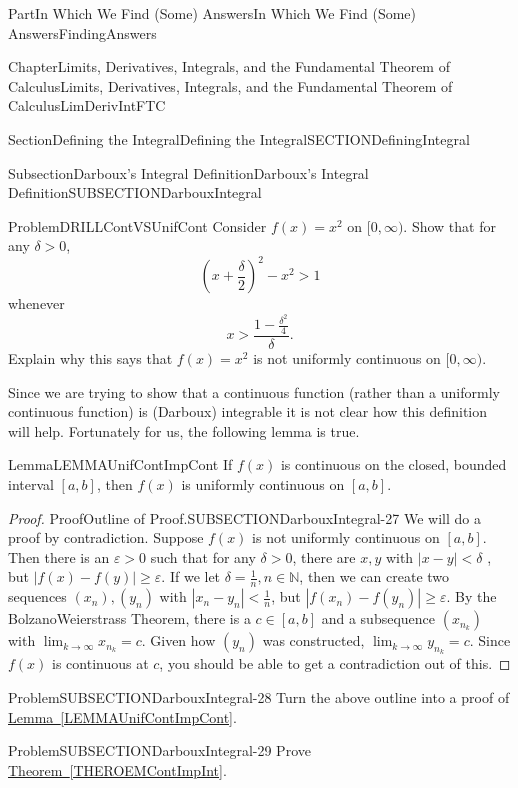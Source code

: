 \documentclass[oneside,10pt,]{book}
\newcommand{\xreffont}{\relax}
\numberwithin{equation}{part}
\def\limit#1#2#3{{\displaystyle\lim_{#1\rightarrow #2}#3}}
\newcommand{\eps}{\varepsilon}
\newcommand{\lt}{<}
\begin{document}
\begin{partptx}{Part}{In Which We Find (Some) Answers}{}{In Which We Find (Some) Answers}{}{}{FindingAnswers}
\begin{chapterptx}{Chapter}{Limits, Derivatives, Integrals, and the Fundamental Theorem of Calculus}{}{Limits, Derivatives, Integrals, and the Fundamental Theorem of Calculus}{}{}{LimDerivIntFTC}
\begin{sectionptx}{Section}{Defining the Integral}{}{Defining the Integral}{}{}{SECTIONDefiningIntegral}
\begin{subsectionptx}{Subsection}{Darboux's Integral Definition}{}{Darboux's Integral Definition}{}{}{SUBSECTIONDarbouxIntegral}
\begin{problem}{Problem}{}{DRILLContVSUnifCont}
Consider \(f(x)=x^2\) on \([0,\infty )\).  Show that for any \(\delta >0\),%
\begin{equation*}
\left(x+\frac{\delta }{2}\right)^2-x^2>1
\end{equation*}
whenever%
\begin{equation*}
x>\frac{1-\frac{{\delta }^2}{4}}{\delta }\text{.}
\end{equation*}
Explain why this says that \(f\left(x\right)=x^2\) is not uniformly continuous on \([0,\infty )\).%
\end{problem}
Since we are trying to show that a continuous function (rather than a uniformly continuous function) is (Darboux) integrable it is not clear how this definition will help. Fortunately for us,  the following lemma is true.%
\begin{lemma}{Lemma}{}{}{LEMMAUnifContImpCont}%
If \(f(x)\) is continuous on the closed, bounded interval \([a,b]\), then \(f(x)\) is uniformly continuous on \([a,b]\).%
\end{lemma}
\begin{proof}{Proof}{Outline of Proof.}{SUBSECTIONDarbouxIntegral-27}
We will do a proof by contradiction.  Suppose \(f(x)\) is not uniformly continuous on \([a,b]\).  Then there is an \(\eps
>0\) such that for any \(\delta >0\), there are \(x,y\) with \(\left|x-y\right|\lt \delta \) , but \(\left|f\left(x\right)-f\left(y\right)\right|\ge \eps \).  If we let \(\delta =\frac{1}{n}, n\in \mathbb{N}\), then we can create two sequences \(\left(x_n\right), (y_n)\) with \(\left|x_n-y_n\right|\lt \frac{1}{n}\), but \(\left|f\left(x_n\right)-f\left(y_n\right)\right|\ge \eps .\) By the Bolzano\textendash{}Weierstrass Theorem, there is a \(c\in [a,b]\) and a subsequence \((x_{n_k})\) with \(\limit{k}{\infty }{ x_{n_k} }=c\).  Given how \((y_n)\) was constructed, \(\limit{k}{\infty }{ y_{n_k} }=c\).  Since \(f(x)\) is continuous at \(c\), you should be able to get a contradiction out of this.%
\end{proof}
\begin{problem}{Problem}{}{SUBSECTIONDarbouxIntegral-28}%
Turn the above outline into a proof of \hyperref[LEMMAUnifContImpCont]{Lemma~{\xreffont\ref{LEMMAUnifContImpCont}}}.%
\end{problem}
\begin{problem}{Problem}{}{SUBSECTIONDarbouxIntegral-29}%
Prove \hyperref[THEROEMContImpInt]{Theorem~{\xreffont\ref{THEROEMContImpInt}}}.%
\end{problem}

\end{subsectionptx}
\end{sectionptx}
\end{chapterptx}
\end{partptx}
\end{document}
